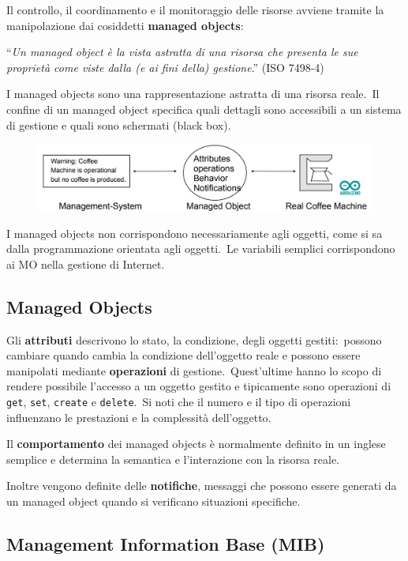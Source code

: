 Il controllo, il coordinamento e il monitoraggio delle risorse avviene tramite la manipolazione dai cosiddetti \textbf{managed objects}:
\begin{center}
    ``\textit{Un managed object è la vista astratta di una risorsa che presenta le sue proprietà come viste dalla (e ai fini della) gestione}.'' (ISO 7498-4)
\end{center}
I managed objects sono una rappresentazione astratta di una risorsa reale.\
Il confine di un managed object specifica quali dettagli sono accessibili a un sistema di gestione e quali sono schermati (black box).\
\begin{figure}[H]
    \centering
    \includegraphics[width=\textwidth]{immagini/MO.jpg}
\end{figure}
\noindent I managed objects non corrispondono necessariamente agli oggetti, come si sa dalla programmazione orientata agli oggetti.\
Le variabili semplici corrispondono ai MO nella gestione di Internet.\

\subsection{Managed Objects}

Gli \textbf{attributi} descrivono lo stato, la condizione, degli oggetti gestiti:\ possono cambiare quando cambia la condizione dell'oggetto reale e possono essere manipolati mediante \textbf{operazioni} di gestione.\
Quest'ultime hanno lo scopo di rendere possibile l'accesso a un oggetto gestito e tipicamente sono operazioni di \texttt{get}, \texttt{set}, \texttt{create} e \texttt{delete}.\
Si noti che il numero e il tipo di operazioni influenzano le prestazioni e la complessità dell'oggetto.

Il \textbf{comportamento} dei managed objects è normalmente definito in un inglese semplice e determina la semantica e l'interazione con la risorsa reale.\

Inoltre vengono definite delle \textbf{notifiche}, messaggi che possono essere generati da un managed object quando si verificano situazioni specifiche.

\subsection{Management Information Base (MIB)}

